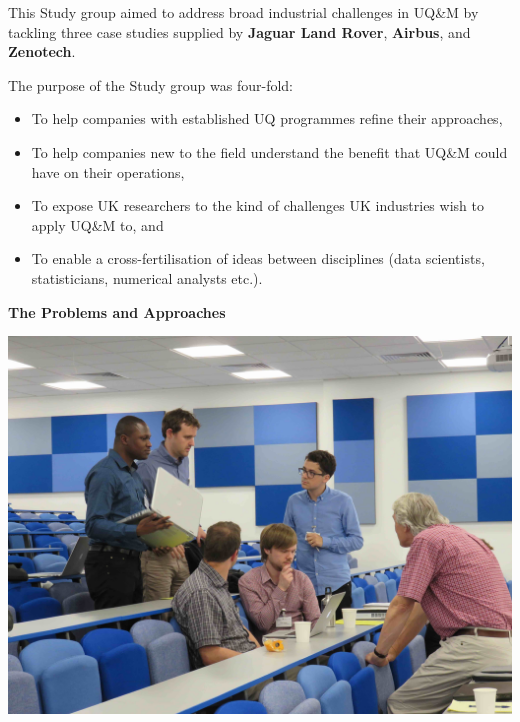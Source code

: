 \documentclass[11pt]{article}%
\begin{document}
\begin{minipage}[!t]{.25\linewidth}
\begin{mdframed}[style=about,frametitle={}]
\BackToContents %

\end{mdframed}\hfill
\end{minipage}
\hspace{0.01\textwidth}
\begin{minipage}[!t]{.75\linewidth}





\begin{multicols}{2} %
This Study group aimed to address broad industrial challenges in UQ\&M by tackling three case studies supplied by \textbf{Jaguar Land Rover}, \textbf{Airbus}, and \textbf{Zenotech}. 

The purpose of the Study group was four-fold:
\begin{itemize}
    \item To help companies with established UQ programmes refine their approaches,
    \vspace{5pt}
    \item To help companies new to the field understand the benefit that UQ\&M could have on their operations,
    \vspace{5pt}
    \item To expose UK researchers to the kind of challenges UK industries wish to apply UQ\&M to, and
    \vspace{5pt}
    \item To enable a cross-fertilisation of ideas between disciplines (data scientists, statisticians, numerical analysts etc.).
\end{itemize}

\vspace{5pt}
{\bf The Problems and Approaches}

\includegraphics[width=0.5 \textwidth]{studygroup/picts/IMG_1580_lr.jpg}


\end{multicols}
\end{minipage}
\end{document}
